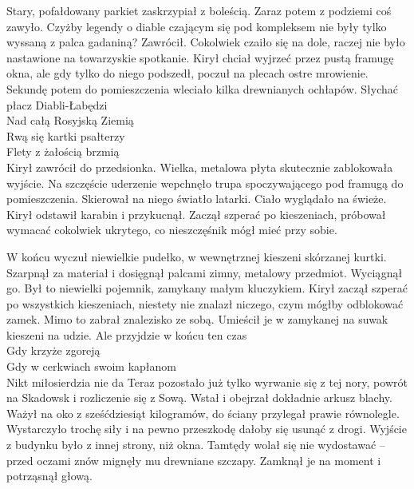 \documentclass[../MAIN.tex]{subfiles}
\begin{document}
Stary, pofałdowany parkiet zaskrzypiał z boleścią. Zaraz potem z podziemi coś zawyło. Czyżby legendy o diable czającym się pod kompleksem nie były tylko wyssaną z palca gadaniną? Zawrócił. Cokolwiek czaiło się na dole, raczej nie było nastawione na towarzyskie spotkanie. Kirył chciał wyjrzeć przez pustą framugę okna, ale gdy tylko do niego podszedł, poczuł na plecach ostre mrowienie. Sekundę potem do pomieszczenia wleciało kilka drewnianych ochłapów.
\sw[14em]
Słychać płacz Diabli-Łabędzi\\
Nad całą Rosyjską Ziemią\\
Rwą się kartki psałterzy\\
Flety z żałością brzmią\\
\qw
Kirył zawrócił do przedsionka. Wielka, metalowa płyta skutecznie zablokowała wyjście. Na szczęście uderzenie wepchnęło trupa spoczywającego pod framugą do pomieszczenia. Skierował na niego światło latarki. Ciało wyglądało na świeże. Kirył odstawił karabin i przykucnął. Zaczął szperać po kieszeniach, próbował wymacać cokolwiek ukrytego, co nieszczęśnik mógł mieć przy sobie.

W końcu wyczuł niewielkie pudełko, w wewnętrznej kieszeni skórzanej kurtki. Szarpnął za materiał i dosięgnął palcami zimny, metalowy przedmiot. Wyciągnął go. Był to niewielki pojemnik, zamykany małym kluczykiem. Kirył zaczął szperać po wszystkich kieszeniach, niestety nie znalazł niczego, czym mógłby odblokować zamek. Mimo to zabrał znalezisko ze sobą. Umieścił je w zamykanej na suwak kieszeni na udzie.
\sw[17em]
Ale przyjdzie w końcu ten czas\\
Gdy krzyże zgoreją\\
Gdy w cerkwiach swoim kapłanom\\
Nikt miłosierdzia nie da
\qw
Teraz pozostało już tylko wyrwanie się z tej nory, powrót na Skadowsk i rozliczenie się z Sową. Wstał i obejrzał dokładnie arkusz blachy. Ważył na oko z sześćdziesiąt kilogramów, do ściany przylegał prawie równolegle. Wystarczyło trochę siły i na pewno przeszkodę dałoby się usunąć z drogi. Wyjście z budynku było z innej strony, niż okna. Tamtędy wolał się nie wydostawać – przed oczami znów mignęły mu drewniane szczapy. Zamknął je na moment i potrząsnął głową.
\end{document}
